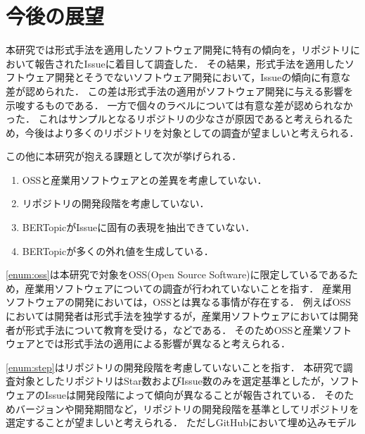 \documentclass[main]{subfiles}
\begin{document}
\chapter{今後の展望}

本研究では形式手法を適用したソフトウェア開発に特有の傾向を，リポジトリにおいて報告されたIssueに着目して調査した．
その結果，形式手法を適用したソフトウェア開発とそうでないソフトウェア開発において，Issueの傾向に有意な差が認められた．
この差は形式手法の適用がソフトウェア開発に与える影響を示唆するものである．
一方で個々のラベルについては有意な差が認められなかった．
これはサンプルとなるリポジトリの少なさが原因であると考えられるため，今後はより多くのリポジトリを対象としての調査が望ましいと考えられる．

この他に本研究が抱える課題として次が挙げられる．

\begin{enumerate}[label=課題\arabic*.]
	\item \label{enum:oss} OSSと産業用ソフトウェアとの差異を考慮していない．
	\item \label{enum:step} リポジトリの開発段階を考慮していない．
	\item \label{enum:domain} BERTopicがIssueに固有の表現を抽出できていない．
	\item \label{enum:outlier} BERTopicが多くの外れ値を生成している．
\end{enumerate}

\ref{enum:oss}は本研究で対象をOSS(Open Source Software)に限定しているであるため，産業用ソフトウェアについての調査が行われていないことを指す．
産業用ソフトウェアの開発においては，OSSとは異なる事情が存在する．
例えばOSSにおいては開発者は形式手法を独学するが，産業用ソフトウェアにおいては開発者が形式手法について教育を受ける，などである．
そのためOSSと産業ソフトウェアとでは形式手法の適用による影響が異なると考えられる．

\ref{enum:step}はリポジトリの開発段階を考慮していないことを指す．
本研究で調査対象としたリポジトリはStar数およびIssue数のみを選定基準としたが，ソフトウェアのIssueは開発段階によって傾向が異なることが報告されている\cite{bissyande:2013}．
そのためバージョンや開発期間など，リポジトリの開発段階を基準としてリポジトリを選定することが望ましいと考えられる．
ただしGitHubにおいて埋め込みモデル
\end{document}
